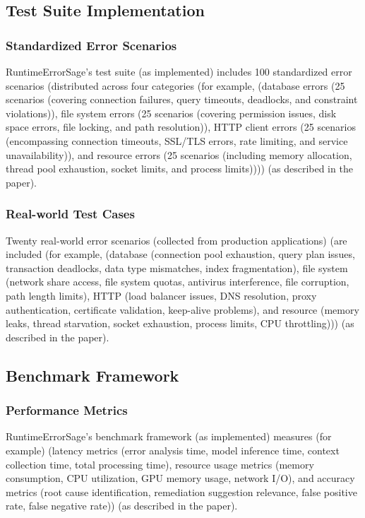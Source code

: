 \subsection{Test Suite Implementation}

\subsubsection{Standardized Error Scenarios}
RuntimeErrorSage's test suite (as implemented) includes 100 standardized error scenarios (distributed across four categories (for example, (database errors (25 scenarios (covering connection failures, query timeouts, deadlocks, and constraint violations)), file system errors (25 scenarios (covering permission issues, disk space errors, file locking, and path resolution)), HTTP client errors (25 scenarios (encompassing connection timeouts, SSL/TLS errors, rate limiting, and service unavailability)), and resource errors (25 scenarios (including memory allocation, thread pool exhaustion, socket limits, and process limits)))) (as described in the paper).

\subsubsection{Real-world Test Cases}
Twenty real-world error scenarios (collected from production applications) (are included (for example, (database (connection pool exhaustion, query plan issues, transaction deadlocks, data type mismatches, index fragmentation), file system (network share access, file system quotas, antivirus interference, file corruption, path length limits), HTTP (load balancer issues, DNS resolution, proxy authentication, certificate validation, keep-alive problems), and resource (memory leaks, thread starvation, socket exhaustion, process limits, CPU throttling))) (as described in the paper).

\subsection{Benchmark Framework}

\subsubsection{Performance Metrics}
RuntimeErrorSage's benchmark framework (as implemented) measures (for example) (latency metrics (error analysis time, model inference time, context collection time, total processing time), resource usage metrics (memory consumption, CPU utilization, GPU memory usage, network I/O), and accuracy metrics (root cause identification, remediation suggestion relevance, false positive rate, false negative rate)) (as described in the paper).

